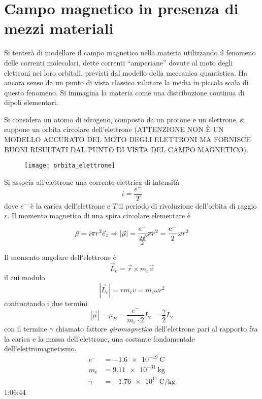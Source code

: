 \newpage
\section{Campo magnetico in presenza di mezzi materiali}
Si tenterà di modellare il campo magnetico nella materia utilizzando il fenomeno
delle correnti molecolari, dette correnti ``amperiane'' dovute al moto
degli elettroni nei loro orbitali, previsti dal modello della meccanica quantistica.
Ha ancora senso da un punto di vista classico valutare la media in piccola scala di questo 
fenomeno. 
Si immagina la materia come una distribuzione continua di dipoli elementari.

Si considera un atomo di idrogeno, composto da un protone e un elettrone, si suppone
un orbita circolare dell'elettrone (ATTENZIONE NON È UN MODELLO ACCURATO DEL MOTO DEGLI ELETTRONI MA FORNISCE BUONI RISULTATI DAL PUNTO DI VISTA DEL CAMPO MAGNETICO).
\begin{figure}[H]
\centering
\texttt{[image: orbita\_elettrone]}
\end{figure}
Si associa all'elettrone una corrente elettrica di intensità
$$
i = \frac{e^-}{T}
$$
dove $e^-$ è la carica dell'elettrone e $T$ il periodo di rivoluzione dell'orbita di raggio $r$.
Il momento magnetico di una spira circolare elementare è 
$$
\vec{\mu} = i \pi r^2 \vec{e}_z \Rightarrow \left|\vec{\mu}\right| = \frac{e^-}{\frac{2\cancel{\pi}}{\omega}}\cancel{\pi} r^2 = \frac{e^-}{2}\omega r^2
$$

Il momento angolare dell'elettrone è 
$$
\vec{L}_e = \vec{r} \times m_e \vec{v}
$$
il cui modulo
$$
\left|\vec{L}_e\right| = r m_e v = m_e \omega r^2
$$
confrontando i due termini 
$$
\left|\vec{\mu}\right| = \mu_B = \frac{e^-}{m_e\cdot 2} L_e = \frac{\gamma}{2}L_e
$$
con il termine $\gamma$ chiamato fattore \textit{giromagnetico} dell'elettrone pari al 
rapporto fra la carica e la massa dell'elettrone, una costante fondamentale 
dell'elettromagnetismo.
\begin{align*}
e^- &= \SI{-1.6e-19}{\coulomb}\\
m_e & = \SI{9.11e-31}{\kilo\gram} \\
\gamma &= \SI{-1.76e11}{\coulomb\per\kilo\gram}
\end{align*}
1:06:44

